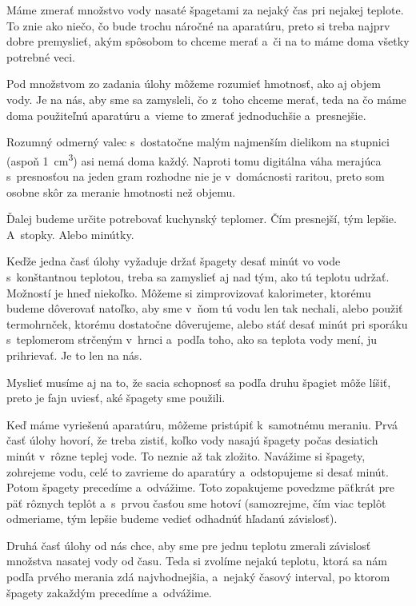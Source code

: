 Máme zmerať množstvo vody nasaté špagetami za nejaký čas pri nejakej teplote.
To znie ako niečo, čo bude trochu náročné na aparatúru, preto si treba najprv dobre premyslieť,
akým spôsobom to chceme merať a~či na to máme doma všetky potrebné veci.

Pod množstvom zo zadania úlohy môžeme rozumieť hmotnosť, ako aj objem vody.
Je na nás, aby sme sa zamysleli, čo z~toho chceme merať, teda na čo máme doma použiteľnú aparatúru a~vieme to zmerať jednoduchšie a~presnejšie.

Rozumný odmerný valec s~dostatočne malým najmenším dielikom na stupnici (aspoň \SI{1}{\centi\metre\cubed}) asi nemá doma každý.
Naproti tomu digitálna váha merajúca s~presnosťou na jeden gram rozhodne nie je v~domácnosti raritou, preto som osobne skôr za meranie hmotnosti než objemu. 

Ďalej budeme určite potrebovať kuchynský teplomer. Čím presnejší, tým lepšie. A~stopky. Alebo minútky. 

Keďže jedna časť úlohy vyžaduje držať špagety desať minút vo vode s~konštantnou teplotou, treba sa zamyslieť aj nad tým, ako tú teplotu udržať.
Možností je hneď niekoľko. Môžeme si zimprovizovať kalorimeter, ktorému budeme dôverovať natoľko, aby sme v~ňom tú vodu len tak nechali,
alebo použiť termohrnček, ktorému dostatočne dôverujeme, alebo stáť desať minút pri sporáku s~teplomerom strčeným v~hrnci a~podľa toho, ako sa teplota vody mení, ju prihrievať. Je to len na nás. 

Myslieť musíme aj na to, že sacia schopnosť sa podľa druhu špagiet môže líšiť, preto je fajn uviesť, aké špagety sme použili.

Keď máme vyriešenú aparatúru, môžeme pristúpiť k~samotnému meraniu. Prvá časť úlohy hovorí, že treba zistiť,
koľko vody nasajú špagety počas desiatich minút v~rôzne teplej vode. To neznie až tak zložito.
Navážime si špagety, zohrejeme vodu, celé to zavrieme do aparatúry a~odstopujeme si desať minút.
Potom špagety precedíme a~odvážime. Toto zopakujeme povedzme päťkrát pre päť rôznych teplôt
a~s~prvou časťou sme hotoví (samozrejme, čím viac teplôt odmeriame, tým lepšie budeme vedieť odhadnúť hľadanú závislosť). 

Druhá časť úlohy od nás chce, aby sme pre jednu teplotu zmerali závislosť množstva nasatej vody od času.
Teda si zvolíme nejakú teplotu, ktorá sa nám podľa prvého merania zdá najvhodnejšia, a~nejaký časový interval, po ktorom špagety zakaždým precedíme a~odvážime. 

